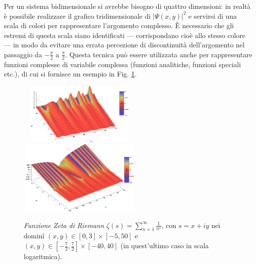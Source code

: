 Per un sistema bidimensionale si avrebbe bisogno di quattro dimensioni:
in realtà è possibile realizzare il grafico tridimensionale di 
$|\Psi(x,y)|^2$ e servirsi di una scala di colori per rappresentare
l'argomento complesso. \`E necessario che gli estremi di questa scala
siano identificati --- corrispondano cioè allo stesso colore --- in modo
da evitare una errata percezione di discontinuità dell'argomento nel
passaggio da $-\frac{\pi}{2}$ a  $\frac{\pi}{2}$. Questa tecnica 
può essere utilizzata anche per rappresentare funzioni complesse di 
variabile complessa (funzioni analitiche, funzioni speciali etc.), di 
cui si fornisce un esempio in Fig. \ref{fig:zeta}. %
\begin{figure}    
  \includegraphics[width=60mm,height=30mm]{img/z/z0.png}
  \includegraphics[width=60mm,height=36mm]{img/z/zwhole5.png}  
  \caption{     \label{fig:zeta}
    \emph{Funzione Zeta di Riemann} 
    $\zeta(s) = \sum_{n=1}^\infty \frac{1}{n^s}$, con $s = x+iy$ 
    nei domin\^{i} 
    $(x,y) \in [0,3]\times[-5,50]$ e
    $(x,y) \in \left[-\frac{7}{2}, \frac{7}{2}\right] \times \left[-40, 40\right]$
    (in quest'ultimo caso in scala logaritmica).
  }
\end{figure}
